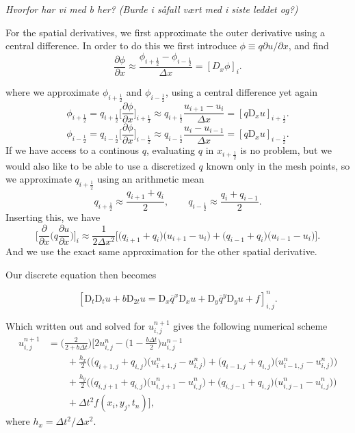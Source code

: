 \documentclass[a4paper, 11pt, notitlepage, english]{article}
\newcommand{\p}{\partial}
\newcommand{\D}{\mbox{D}}
\begin{document}
\textit{Hvorfor har vi med b her? (Burde i såfall vært med i siste leddet og?)}

For the spatial derivatives, we first approximate the outer derivative using a central difference. In order to do this we first introduce $\phi \equiv q \p u/\p x$, and find
$$\frac{\p \phi}{\p x} \approx \frac{\phi_{i+\frac{1}{2}} - \phi_{i-\frac{1}{2}}}{\Delta x} = [D_x \phi]_{i}.$$

where we approximate $\phi_{i+\frac{1}{2}}$ and $\phi_{i-\frac{1}{2}}$, using a central difference yet again
$$\phi_{i+\frac{1}{2}} = q_{i+\frac{1}{2}}\bigg[\frac{\p \phi}{\p x}\bigg]_{i+\frac{1}{2}} \approx q_{i+\frac{1}{2}} \frac{u_{i+1} - u_{i}}{\Delta x} = [q\D_x u]_{i+\frac{1}{2}}.$$
$$\phi_{i-\frac{1}{2}} = q_{i-\frac{1}{2}}\bigg[\frac{\p \phi}{\p x}\bigg]_{i-\frac{1}{2}} \approx q_{i-\frac{1}{2}} \frac{u_{i} - u_{i-1}}{\Delta x} = [q\D_x u]_{i-\frac{1}{2}}.$$
If we have access to a continous $q$, evaluating $q$ in $x_{i+\frac{1}{2}}$ is no problem, but we would also like to be able to use a discretized $q$ known only in the mesh points, 
so we approximate $q_{i+\frac{1}{2}}$ using an arithmetic mean
$$q_{i+\frac{1}{2}} \approx \frac{q_{i+1} + q_i}{2}, \qquad q_{i-\frac{1}{2}} \approx \frac{q_{i} + q_{i-1}}{2}.$$
Inserting this, we have
$$\bigg[\frac{\p}{\p x}\bigg(q\frac{\p u}{\p x}\bigg)\bigg]_i \approx \frac{1}{2\Delta x^2}\bigg[\big(q_{i+1}+q_i\big)\big(u_{i+1}-u_i\big) + \big(q_{i-1} + q_i\big)\big(u_{i-1}-u_i\big)\bigg].$$
And we use the exact same approximation for the other spatial derivative.

Our discrete equation then becomes

$$[\D_t\D_t u + b\D_{2t}u = \D_x \overline{q}^{x}\D_x u + \D_y \overline{q}^y \D_y u + f]^{n}_{i,j}.$$

Which written out and solved for $u_{i,j}^{n+1}$ gives the following numerical scheme
\begin{align*}
u_{i,j}^{n+1} &= \bigg(\frac{2}{2+b\Delta t}\bigg)\Bigg[2u_{i,j}^n - \bigg(1-\frac{b\Delta t}{2}\bigg)u_{i,j}^{n-1} \\ 
&\qquad + \frac{h_x}{2}\bigg(\big(q_{i+1,j}+q_{i,j}\big)\big(u_{i+1,j}^n-u_{i,j}^n\big) + \big(q_{i-1,j} + q_{i,j}\big)\big(u_{i-1,j}^n-u_{i,j}^n\big)\bigg) \\
&\qquad + \frac{h_y}{2}\bigg(\big(q_{i,j+1}+q_{i,j}\big)\big(u_{i,j+1}^n-u_{i,j}^n\big) + \big(q_{i,j-1} + q_{i,j}\big)\big(u_{i,j-1}^n-u_{i,j}^n\big)\bigg) \\
&\qquad + \Delta t^2 f(x_i, y_j, t_n) \bigg],
\end{align*}
where $h_x = \Delta t^2/\Delta x^2$.
\end{document}
